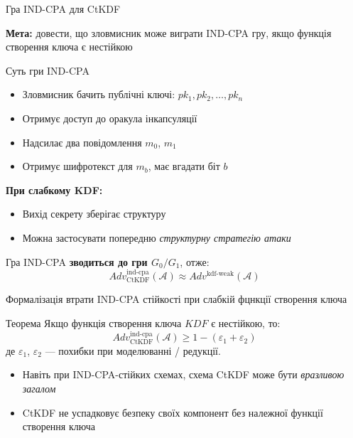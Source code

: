 \documentclass{beamer}
\begin{document}
\begin{frame}{Гра IND-CPA для CtKDF}

\vspace{0.5em}
\textbf{Мета:} довести, що зловмисник може виграти IND-CPA гру, якщо функція створення ключа є нестійкою

\vspace{1em}
\begin{block}{Суть гри IND-CPA}
\begin{itemize}
  \item Зловмисник бачить публічні ключі: $pk_1, pk_2, \dots, pk_n$
  \item Отримує доступ до оракула інкапсуляції
  \item Надсилає два повідомлення $m_0$, $m_1$
  \item Отримує шифротекст для $m_b$, має вгадати біт $b$
\end{itemize}
\end{block}

\vspace{0.5em}
\textbf{При слабкому KDF:}
\begin{itemize}
  \item Вихід секрету зберігає структуру
  \item Можна застосувати попередню \textit{структурну стратегію атаки}
\end{itemize}

\vspace{0.5em}
Гра IND-CPA \textbf{зводиться до гри $G_0/G_1$}, отже:
\[
  Adv^{\text{ind-cpa}}_{\text{CtKDF}}(\mathcal{A}) \approx Adv^{\text{kdf-weak}}(\mathcal{A})
\]

\end{frame}


\begin{frame}{Формалізація втрати IND-CPA стійкості при слабкій фцнкції створення ключа}

\vspace{0.5em}

\vspace{1em}
\begin{block}{Теорема}
Якщо функція створення ключа $KDF$ є нестійкою, то:
\[
  Adv^{\text{ind-cpa}}_{\text{CtKDF}}(\mathcal{A}) \geq 1 - (\varepsilon_1 + \varepsilon_2)
\]
де $\varepsilon_1$, $\varepsilon_2$ — похибки при моделюванні / редукції.
\end{block}

\vspace{1em}
\begin{itemize}
  \item Навіть при IND-CPA-стійких схемах, схема CtKDF може бути \textit{вразливою загалом}
  \item CtKDF не успадковує безпеку своїх компонент без належної функції створення ключа
\end{itemize}

\vspace{0.5em}


\end{frame}
\end{document}

